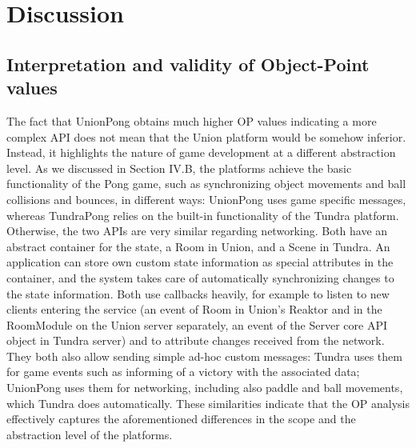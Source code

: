 \documentclass[conference]{IEEEtran}
\begin{document}
\section{Discussion}

\subsection{Interpretation and validity of Object-Point values}

The fact that UnionPong obtains much higher OP values indicating a
more complex API does not mean that the Union platform would be
somehow inferior. Instead, it highlights the nature of game
development at a different abstraction level. As we discussed in
Section IV.B, the platforms achieve the basic functionality of the
Pong game, such as synchronizing object movements and ball collisions
and bounces, in different ways: UnionPong uses game specific messages,
whereas TundraPong relies on the built-in functionality of the Tundra
platform. Otherwise, the two APIs are very similar regarding
networking. Both have an abstract container for the state, a Room in
Union, and a Scene in Tundra. An application can store own custom
state information as special attributes in the container, and the
system takes care of automatically synchronizing changes to the state
information. Both use callbacks heavily, for example to listen to new
clients entering the service (an event of Room in Union’s Reaktor and
in the RoomModule on the Union server separately, an event of the
Server core API object in Tundra server) and to attribute changes
received from the network. They both also allow sending simple ad-hoc
custom messages: Tundra uses them for game events such as informing of
a victory with the associated data; UnionPong uses them for
networking, including also paddle and ball movements, which Tundra
does automatically. These similarities indicate that the OP analysis
effectively captures the aforementioned differences in the scope and
the abstraction level of the platforms.
\end{document}
